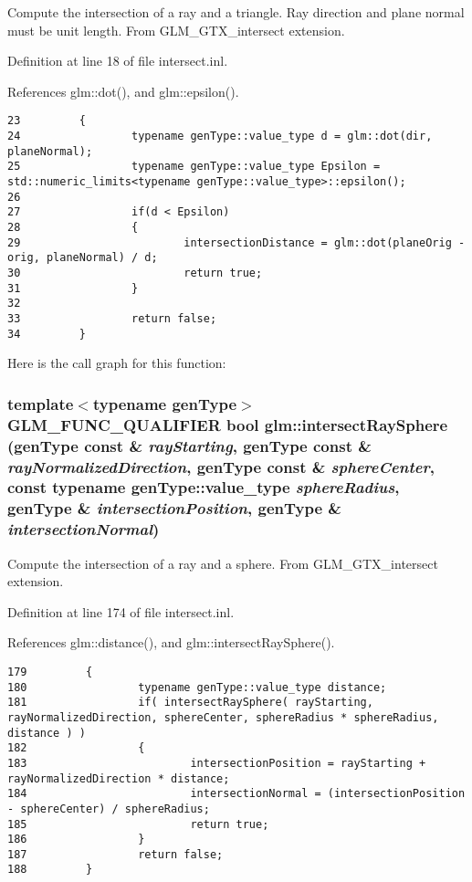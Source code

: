 Compute the intersection of a ray and a triangle. Ray direction and plane normal must be unit length. From GLM\_\-GTX\_\-intersect extension. 

Definition at line 18 of file intersect.inl.

References glm::dot(), and glm::epsilon().

\begin{Code}\begin{verbatim}23         {
24                 typename genType::value_type d = glm::dot(dir, planeNormal);
25                 typename genType::value_type Epsilon = std::numeric_limits<typename genType::value_type>::epsilon();
26 
27                 if(d < Epsilon)
28                 {
29                         intersectionDistance = glm::dot(planeOrig - orig, planeNormal) / d;
30                         return true;
31                 }
32 
33                 return false;
34         }
\end{verbatim}
\end{Code}




Here is the call graph for this function:\hypertarget{group__gtx__intersect_g2e6a97dd3fcdbf83c24dd3499f81014b}{
\subsubsection[intersectRaySphere]{\setlength{\rightskip}{0pt plus 5cm}template$<$typename genType$>$ GLM\_\-FUNC\_\-QUALIFIER bool glm::intersectRaySphere (genType const \& {\em rayStarting}, \/  genType const \& {\em rayNormalizedDirection}, \/  genType const \& {\em sphereCenter}, \/  const typename genType::value\_\-type {\em sphereRadius}, \/  genType \& {\em intersectionPosition}, \/  genType \& {\em intersectionNormal})}}
\label{group__gtx__intersect_g2e6a97dd3fcdbf83c24dd3499f81014b}


Compute the intersection of a ray and a sphere. From GLM\_\-GTX\_\-intersect extension. 

Definition at line 174 of file intersect.inl.

References glm::distance(), and glm::intersectRaySphere().

\begin{Code}\begin{verbatim}179         {
180                 typename genType::value_type distance;
181                 if( intersectRaySphere( rayStarting, rayNormalizedDirection, sphereCenter, sphereRadius * sphereRadius, distance ) )
182                 {
183                         intersectionPosition = rayStarting + rayNormalizedDirection * distance;
184                         intersectionNormal = (intersectionPosition - sphereCenter) / sphereRadius;
185                         return true;
186                 }
187                 return false;
188         }
\end{verbatim}
\end{Code}




